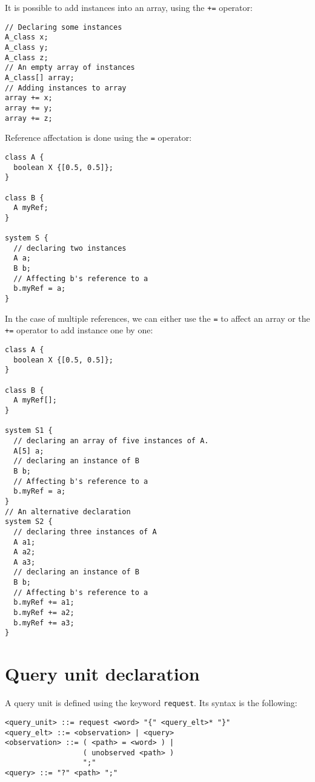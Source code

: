 \documentclass[12pt,a4paper]{article}
\begin{document}
It is possible to add instances into an array, using the \verb-+=- operator:

\begin{footnotesize}
\begin{verbatim}
// Declaring some instances
A_class x;
A_class y;
A_class z;
// An empty array of instances
A_class[] array;
// Adding instances to array
array += x;
array += y;
array += z;
\end{verbatim}
\end{footnotesize}

Reference affectation is done using the \verb+=+ operator:

\begin{footnotesize}
\begin{verbatim}
class A {
  boolean X {[0.5, 0.5]};
}

class B {
  A myRef;
}

system S {
  // declaring two instances
  A a;
  B b;
  // Affecting b's reference to a
  b.myRef = a;
}
\end{verbatim}
\end{footnotesize}

In the case of multiple references, we can either use the \verb+=+ to affect
an array or the \verb-+=- operator to add instance one by one:

\begin{footnotesize}
\begin{verbatim}
class A {
  boolean X {[0.5, 0.5]};
}

class B {
  A myRef[];
}

system S1 {
  // declaring an array of five instances of A.
  A[5] a;
  // declaring an instance of B
  B b;
  // Affecting b's reference to a
  b.myRef = a;
}
// An alternative declaration
system S2 {
  // declaring three instances of A
  A a1;
  A a2;
  A a3;
  // declaring an instance of B
  B b;
  // Affecting b's reference to a
  b.myRef += a1;
  b.myRef += a2;
  b.myRef += a3;
}
\end{verbatim}
\end{footnotesize}

\section{Query unit declaration}

A query unit is defined using the keyword \verb+request+. Its syntax is the
following:

\begin{footnotesize}
\begin{verbatim}
<query_unit> ::= request <word> "{" <query_elt>* "}"
<query_elt> ::= <observation> | <query>
<observation> ::= ( <path> = <word> ) |
                  ( unobserved <path> )
                  ";"
<query> ::= "?" <path> ";"
\end{verbatim}
\end{footnotesize}
\end{document}
